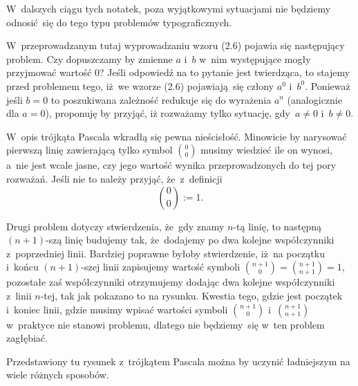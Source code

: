 \documentclass[a4paper,11pt]{article}
\numberwithin{equation}{section}
\begin{document}
W~dalszych ciągu tych notatek, poza wyjątkowymi sytuacjami nie będziemy
odnosić~się do tego typu problemów typograficznych.

\vspace{\spaceFour}





\noindent
{} W~przeprowadzanym tutaj wyprowadzaniu wzoru (2.6) pojawia się
następujący problem. Czy dopuszczamy by zmienne $a$ i~$b$ w~nim występujące
mogły przyjmować wartość $0$? Jeśli odpowiedź na to pytanie jest twierdząca,
to stajemy przed problemem tego, iż~we wzorze (2.6) pojawiają~się
człony $a^{ 0 }$ i~$b^{ 0 }$. Ponieważ jeśli $b = 0$ to poszukiwana zależność
redukuje się do wyrażenia $a^{ n }$ (analogicznie dla $a = 0$), proponuję by
przyjąć, iż rozważamy tylko sytuację, gdy~$a \neq 0$ i~$b \neq 0$.

\vspace{\spaceFour}





 W~opis trójkąta Pascala wkradłą się pewna nieścisłość. Minowicie by
narysować pierwszą linię zawierającą tylko symbol $\binom{ 0 }{ 0 }$ musimy wiedzieć
ile on wynosi, a~nie jest wcale jasne, czy jego wartość wynika przeprowadzonych
do tej pory rozważań. Jeśli nie to należy przyjąć, że~z~definicji
\begin{equation}
  \label{Gancarzewicz-Arytmetyka-03}
  \binom{ 0 }{ 0 } := 1.
\end{equation}

Drugi problem dotyczy stwierdzenia, że~gdy znamy $n$-tą linię, to następną
$( n + 1 )$-szą linię budujemy tak, że~dodajemy po dwa kolejne współczynniki
z~poprzedniej linii. Bardziej poprawne byłoby stwierdzenie, iż~na początku
i~końcu $( n + 1 )$-szej linii zapisujemy wartość symboli
$\binom{ n + 1 }{ 0 } = \binom{ n + 1 }{ n + 1 } = 1$, pozostałe zaś
współczynniki otrzymujemy dodając dwa kolejne współczynniki z~linii $n$-tej,
tak jak pokazano to na rysunku. Kwestia tego, gdzie jest początek i~koniec
linii, gdzie musimy wpisać wartości symboli $\binom{ n + 1 }{ 0 }$
i~$\binom{ n + 1 }{ n + 1 }$ w~praktyce nie stanowi problemu, dlatego nie
będziemy~się w~ten problem zagłębiać.

\vspace{\spaceFour}





\noindent
{} Przedstawiony tu rysunek z~trójkątem Pascala można by uczynić
ładniejszym na wiele różnych sposobów.
\end{document}

